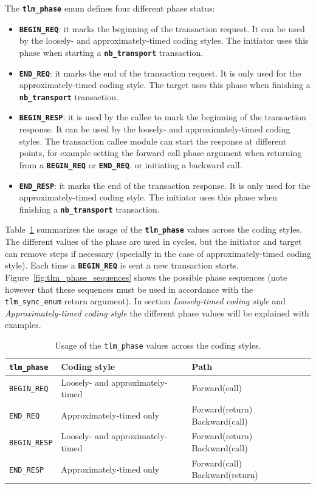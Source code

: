 {The \texttt{\textbf{tlm\_phase}} enum defines four different phase status:
\begin{itemize}
	\item \texttt{\textbf{BEGIN\_REQ}}: it marks the beginning of the transaction request.
	It can be used by the loosely- and approximately-timed coding styles.
	The initiator uses this phase when starting a \texttt{\textbf{nb\_transport}} transaction.
	\item \texttt{\textbf{END\_REQ}}: it marks the end of the transaction request.
	It is only used for the approximately-timed coding style.
	The target uses this phase when finishing a \texttt{\textbf{nb\_transport}} transaction.
	\item \texttt{\textbf{BEGIN\_RESP}}: it is used by the callee to mark the beginning of the transaction response.
	It can be used by the loosely- and approximately-timed coding styles.
	The transaction callee module can start the response at different points, for example setting the forward call phase argument when returning from a \texttt{\textbf{BEGIN\_REQ}} or \texttt{\textbf{END\_REQ}}, or initiating a backward call.
	\item \texttt{\textbf{END\_RESP}}: it marks the end of the transaction response.
	It is only used for the approximately-timed coding style.
	The initiator uses this phase when finishing a \texttt{\textbf{nb\_transport}} transaction.
\end{itemize}
Table~\ref{table:tlm_phase_values} summarizes the usage of the \texttt{\textbf{tlm\_phase}} values across the coding styles.
The different values of the phase are used in cycles, but the initiator and target can remove steps if necessary (specially in the case of approximately-timed coding style).
Each time a \texttt{\textbf{BEGIN\_REQ}} is sent a new transaction starts.
Figure~\ref{fig:tlm_phase_sequences} shows the possible phase sequences (note however that these sequences must be used in accordance with the \texttt{tlm\_sync\_enum} return argument).
In section \emph{Loosely-timed coding style} and \emph{Approximately-timed coding style} the different phase values will be explained with examples.

\begin{table}[h]
	\begin{center}
	\begin{tabular}{|l|l|l|}
		\hline
		\texttt{\textbf{tlm\_phase}} & \textbf{Coding style} & \textbf{Path} \\
		\hline
		\texttt{BEGIN\_REQ} & Loosely- and approximately-timed & Forward(call) \\
		\hline
		\texttt{END\_REQ} & Approximately-timed only & Forward(return) Backward(call) \\
		\hline
		\texttt{BEGIN\_RESP} & Loosely- and approximately-timed & Forward(return) Backward(call) \\
		\hline
		\texttt{END\_RESP} & Approximately-timed only & Forward(call) Backward(return) \\
		\hline
	\end{tabular}
	\end{center}
	\caption{Usage of the \texttt{tlm\_phase} values across the coding styles.}
	\label{table:tlm_phase_values}
\end{table}


}
